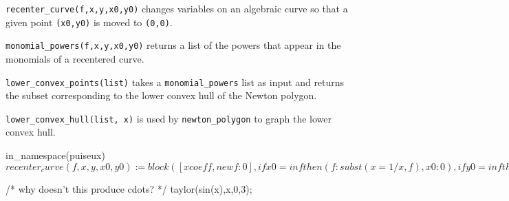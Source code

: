 {\tt recenter_curve(f,x,y,x0,y0)} changes variables on an algebraic curve
so that a given point {\tt (x0,y0)} is moved to {\tt (0,0)}.

{\tt monomial_powers(f,x,y,x0,y0)} returns a list of the powers that
appear in the monomials of a recentered curve.

{\tt lower_convex_points(list)} takes a {\tt monomial_powers} list as
input and returns the subset corresponding to the lower convex hull
of the Newton polygon.

{\tt lower_convex_hull(list, x)} is used by {\tt newton_polygon}
to graph the lower convex hull.

\vfill\eject

\begin{maximablock}
in_namespace(puiseux)$

recenter_curve(f,x,y,x0,y0) := block([xcoeff, newf:0],
   if x0 = inf then (f:subst(x=1/x, f), x0:0),
   if y0 = inf then (f:subst(y=1/y, f), y0:0),
   f : num(ratsimp(f)),
   f : expand(subst([y=y+y0, x=x+x0], f)),
   for xpow: 0 thru hipow(f, x) do (
      xcoeff : coeff(f, x, xpow),
      for ypow: 0 thru hipow(xcoeff, y) do
         newf : newf + radcan(ratsimp(coeff(xcoeff, y, ypow)))*x^xpow*y^ypow
   ),
   newf
)$
\end{maximablock}

\begin{maximablock}
/* why doesn't this produce cdots? */
taylor(sin(x),x,0,3);
\end{maximablock}


